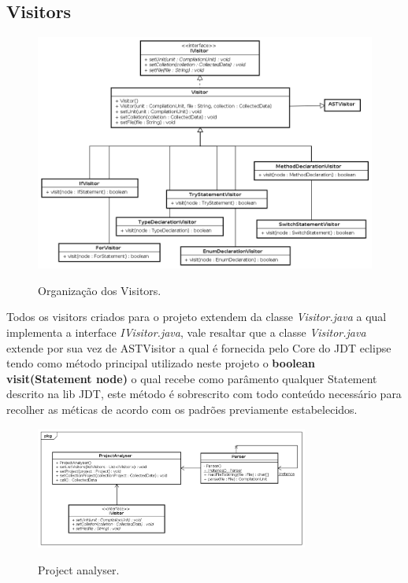 \subsection{Visitors}
\begin{figure}[h]
\center
\includegraphics[width=1.0\textwidth]{Imagens/Visitors}
\label{arquiteturaVisitor}
\caption{Organização dos Visitors.}
\end{figure}

Todos os visitors criados para o projeto extendem da classe \textit{Visitor.java} a qual implementa a interface \textit{IVisitor.java}, vale resaltar que a classe \textit{Visitor.java} extende por sua vez de ASTVisitor a qual é fornecida pelo Core do JDT eclipse tendo como método principal utilizado neste projeto o \textbf{boolean visit(Statement node)} o qual recebe como parâmento qualquer Statement descrito na lib JDT, este método é sobrescrito com todo conteúdo necessário para recolher as méticas de acordo com os padrões previamente estabelecidos.\\


\clearpage
\begin{figure}[h]
	\center
	\includegraphics[width=0.8\textwidth]{Imagens/ProjectAnalyser}
	\label{ProjectAnalyser}
	\caption{Project analyser.}
\end{figure}

